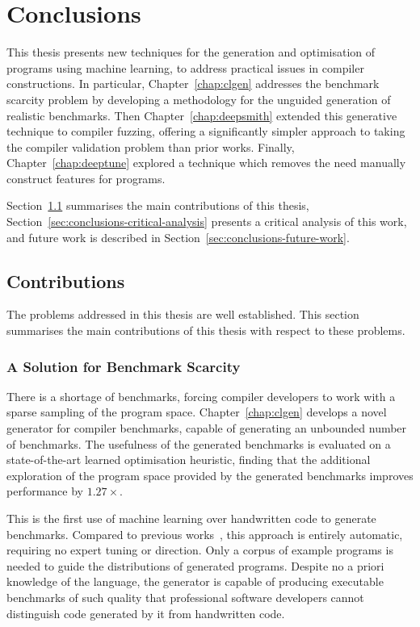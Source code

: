 \chapter{Conclusions}
\label{chap:conclusions}

This thesis presents new techniques for the generation and optimisation of programs using machine learning, to address practical issues in compiler constructions. In particular, Chapter~\ref{chap:clgen} addresses the benchmark scarcity problem by developing a methodology for the unguided generation of realistic benchmarks. Then Chapter~\ref{chap:deepsmith} extended this generative technique to compiler fuzzing, offering a significantly simpler approach to taking the compiler validation problem than prior works. Finally, Chapter~\ref{chap:deeptune} explored a technique which removes the need manually construct features for programs.

Section~\ref{sec:conclusions-contributions} summarises the main contributions of this thesis, Section~\ref{sec:conclusions-critical-analysis} presents a critical analysis of this work, and future work is described in Section~\ref{sec:conclusions-future-work}.


\section{Contributions}
\label{sec:conclusions-contributions}

The problems addressed in this thesis are well established. This section summarises the main contributions of this thesis with respect to these problems.


\subsection{A Solution for Benchmark Scarcity}

There is a shortage of benchmarks, forcing compiler developers to work with a sparse sampling of the program space. Chapter~\ref{chap:clgen} develops a novel generator for compiler benchmarks, capable of generating an unbounded number of benchmarks. The usefulness of the generated benchmarks is evaluated on a state-of-the-art learned optimisation heuristic, finding that the additional exploration of the program space provided by the generated benchmarks improves performance by $1.27\times$.

This is the first use of machine learning over handwritten code to generate benchmarks. Compared to previous works~\cite{Chiu2015}, this approach is entirely automatic, requiring no expert tuning or direction. Only a corpus of example programs is needed to guide the distributions of generated programs. Despite no a priori knowledge of the language, the generator is capable of producing executable benchmarks of such quality that professional software developers cannot distinguish code generated by it from handwritten code.

